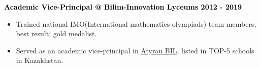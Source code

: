 \documentclass[10pt,letterpaper]{letter}
\newcommand{\gsubsect}[1]{\textcolor{black}{\textbf{{\large #1 }}} }
\begin{document}
\gsubsect{Academic Vice-Principal  @ Bilim-Innovation Lyceums \hfill 2012 - 2019 }
\begin{itemize}
	\item Trained national IMO(International mathematics olympiads) team members, best result: gold \href{https://www.imo-official.org/participant_r.aspx?id=30786}{medalist}.
	\item Served as an academic vice-principal in \href{https://bil.edu.kz/en/}{Atyrau BIL}, listed in TOP-5 schools in Kazakhstan. 
\end{itemize}


%


\end{document}
